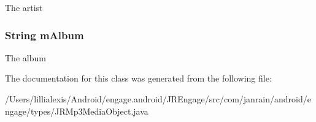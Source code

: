 \label{classcom_1_1janrain_1_1android_1_1engage_1_1types_1_1_j_r_mp3_media_object_a447e5238acd3b656ad1658af4d1d585b}
The artist \hypertarget{classcom_1_1janrain_1_1android_1_1engage_1_1types_1_1_j_r_mp3_media_object_a0beebc1720c6f4bcf3190b3a112658b4}{
\subsubsection[{mAlbum}]{\setlength{\rightskip}{0pt plus 5cm}String {\bf mAlbum}}}
\label{classcom_1_1janrain_1_1android_1_1engage_1_1types_1_1_j_r_mp3_media_object_a0beebc1720c6f4bcf3190b3a112658b4}
The album 

The documentation for this class was generated from the following file:\begin{DoxyCompactItemize}
\item 
/Users/lillialexis/Android/engage.android/JREngage/src/com/janrain/android/engage/types/JRMp3MediaObject.java\end{DoxyCompactItemize}
